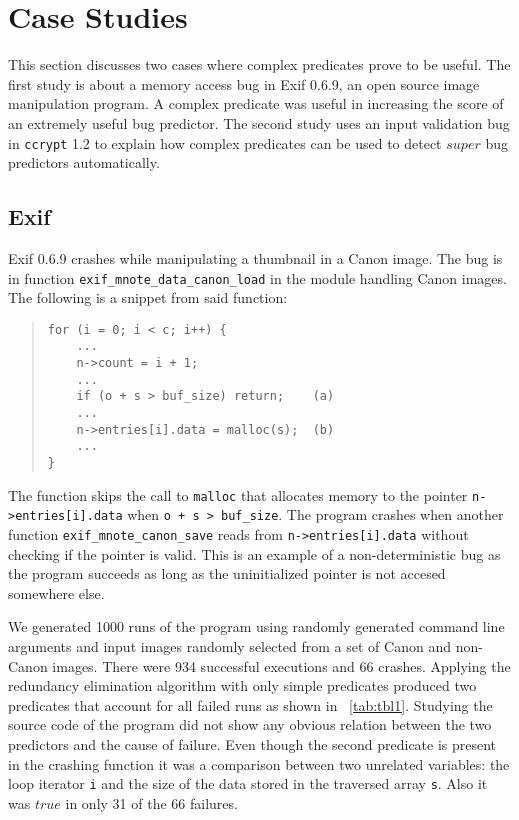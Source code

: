 \section{Case Studies}
\label{sec-qual}
This section discusses two cases where complex predicates prove to be useful.  The first study is about a memory access bug in Exif 0.6.9, an open source image manipulation program.  A complex predicate was useful in increasing the score of an extremely useful bug predictor.  The second study uses an input validation bug in \texttt{ccrypt} 1.2 to explain how complex predicates can be used to detect $super$ bug predictors automatically.

\subsection{Exif}
Exif 0.6.9 crashes while manipulating a thumbnail in a Canon image.  The bug is in function \texttt{exif\_mnote\_data\_canon\_load} in the module handling Canon images.  The following is a snippet from said function:
\begin{quote}
\begin{verbatim}
for (i = 0; i < c; i++) {
    ...
    n->count = i + 1;
    ...
    if (o + s > buf_size) return;    (a)
    ...
    n->entries[i].data = malloc(s);  (b)
    ...
}
\end{verbatim}
\end{quote}

The function skips the call to \texttt{malloc} that allocates memory to the pointer \texttt{n->entries[i].data} when \texttt{o + s > buf\_size}.  The program crashes when another function \texttt{exif\_\-mnote\_\-canon\_save} reads from \texttt{n->entries[i].data} without checking if the pointer is valid.  This is an example of a non-deterministic bug as the program succeeds as long as the uninitialized pointer is not accesed somewhere else.

We generated 1000 runs of the program using randomly generated command line arguments and input images randomly selected from a set of Canon and non-Canon images.  There were 934 successful executions and 66 crashes.  Applying the redundancy elimination algorithm with only simple predicates produced two predicates that account for all failed runs as shown in ~\autoref{tab:tbl1}.  Studying the source code of the program did not show any obvious relation between the two predictors and the cause of failure.  Even though the second predicate is present in the crashing function it was a comparison between two unrelated variables: the loop iterator \texttt{i} and the size of the data stored in the traversed array \texttt{s}.  Also it was $true$ in only 31 of the 66 failures.

